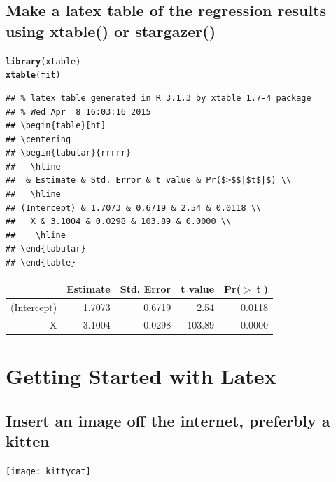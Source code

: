 \documentclass{article}\usepackage[]{graphicx}\usepackage[]{color}
\makeatletter
\newcommand{\hlstd}[1]{\textcolor[rgb]{0.345,0.345,0.345}{#1}}%
\newcommand{\hlkwd}[1]{\textcolor[rgb]{0.737,0.353,0.396}{\textbf{#1}}}%
\newenvironment{kframe}{%
 \def\at@end@of@kframe{}%
 \ifinner\ifhmode%
  \def\at@end@of@kframe{\end{minipage}}%
  \begin{minipage}{\columnwidth}%
 \fi\fi%
 \def\FrameCommand##1{\hskip\@totalleftmargin \hskip-\fboxsep
 \colorbox{shadecolor}{##1}\hskip-\fboxsep
     \hskip-\linewidth \hskip-\@totalleftmargin \hskip\columnwidth}%
 \MakeFramed {\advance\hsize-\width
   \@totalleftmargin\z@ \linewidth\hsize
   \@setminipage}}%
 {\par\unskip\endMakeFramed%
 \at@end@of@kframe}
\newenvironment{knitrout}{}{} %
\makeatother
\begin{document}
\subsection{Make a latex table of the regression results using xtable() or stargazer()}
\begin{knitrout}
\color{fgcolor}\begin{kframe}
\begin{alltt}
\hlkwd{library}\hlstd{(xtable)}
\hlkwd{xtable}\hlstd{(fit)}
\end{alltt}
\begin{verbatim}
## % latex table generated in R 3.1.3 by xtable 1.7-4 package
## % Wed Apr  8 16:03:16 2015
## \begin{table}[ht]
## \centering
## \begin{tabular}{rrrrr}
##   \hline
##  & Estimate & Std. Error & t value & Pr($>$$|$t$|$) \\ 
##   \hline
## (Intercept) & 1.7073 & 0.6719 & 2.54 & 0.0118 \\ 
##   X & 3.1004 & 0.0298 & 103.89 & 0.0000 \\ 
##    \hline
## \end{tabular}
## \end{table}
\end{verbatim}
\end{kframe}
\end{knitrout}

\begin{table}[ht]
\centering
\begin{tabular}{rrrrr}
   \hline
  & Estimate & Std. Error & t value & Pr($>$$|$t$|$) \\
   \hline
 (Intercept) & 1.7073 & 0.6719 & 2.54 & 0.0118 \\
   X & 3.1004 & 0.0298 & 103.89 & 0.0000 \\
    \hline
 \end{tabular}
 \end{table}

\section{Getting Started with Latex}
\subsection{Insert an image off the internet, preferbly a kitten}

\texttt{[image: kittycat]}
\end{document}
